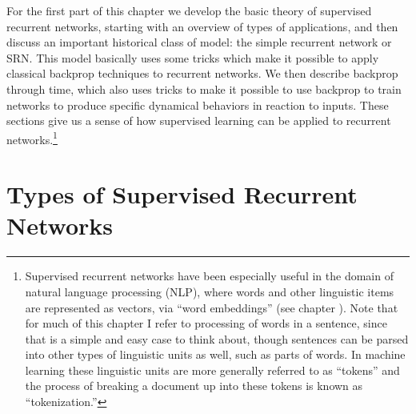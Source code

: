 For the first part of this chapter we develop the basic theory of supervised recurrent networks, starting with an overview of types of applications, and then discuss an important historical class of model: the simple recurrent network or SRN. This model basically uses some tricks which make it possible to apply classical backprop techniques to recurrent networks. We then describe backprop through time, which also uses tricks to make it possible to use backprop to train networks to produce specific dynamical behaviors in reaction to inputs. These sections give us a sense of how supervised learning can be applied to recurrent networks.\footnote{Supervised recurrent networks have been especially useful in the domain of natural language processing (NLP), where words and other linguistic items are represented as vectors, via ``word embeddings'' (see chapter ). Note that  for much of this chapter I refer to processing of words in a sentence, since that is a simple and easy case to think about, though sentences can be parsed into other types of linguistic units as well, such as parts of words. In machine learning these linguistic units are more generally referred to as ``tokens'' and the process of breaking a document up into these tokens is known as ``tokenization.''}
	
\section{Types of Supervised Recurrent Networks}

